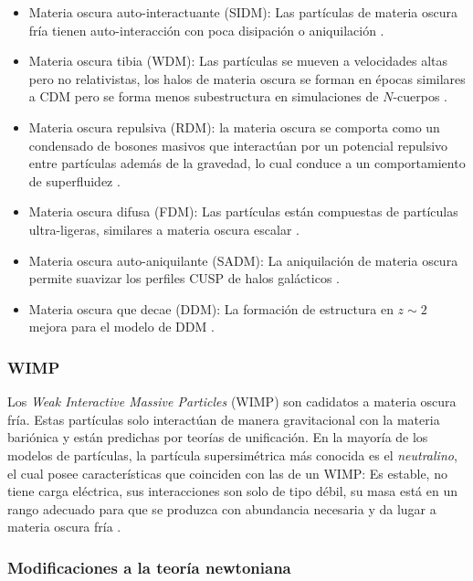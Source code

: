 \documentclass[a4paper,openright,10pt, oneside, final]{book}
\begin{document}
\begin{itemize}
\item Materia oscura auto-interactuante (SIDM): Las partículas de materia oscura fría tienen auto-interacción con poca disipación o aniquilación \cite{1.3.1}.
\item Materia oscura tibia (WDM): Las partículas se mueven a velocidades altas pero no relativistas, los halos de materia oscura se forman en épocas similares a CDM pero se forma menos subestructura en simulaciones de $N$-cuerpos \cite{1.3.2}.
\item Materia oscura repulsiva (RDM): la materia oscura se comporta como un condensado de bosones masivos que interactúan por un potencial repulsivo entre partículas además de la gravedad, lo cual conduce a un comportamiento de superfluidez \cite{1.3.3}.
\item Materia oscura difusa (FDM): Las partículas están compuestas de partículas ultra-ligeras, similares a materia oscura escalar \cite{1.3.4}.
\item Materia oscura auto-aniquilante (SADM): La aniquilación de materia oscura permite suavizar los perfiles CUSP de halos galácticos \cite{1.3.5}.
\item Materia oscura que decae (DDM):  La formación de estructura en $z \sim 2$ mejora para el modelo de DDM \cite{1.3.6}.
\end{itemize}


\subsubsection*{WIMP}
Los \textit{Weak Interactive Massive Particles} (WIMP) son cadidatos a materia oscura fría. Estas partículas solo interactúan de manera gravitacional con la materia bariónica y están predichas por teorías de unificación. En la mayoría de los modelos de partículas, la partícula supersimétrica más conocida es el \textit{neutralino}, el cual posee  características que coinciden con las de un WIMP: Es estable, no tiene carga eléctrica, sus interacciones son solo de tipo débil, su masa está en un rango adecuado para que se produzca con abundancia necesaria y da lugar a materia oscura fría \cite{1.3.7}.

\subsubsection*{Modificaciones a la teoría newtoniana}
\end{document}

